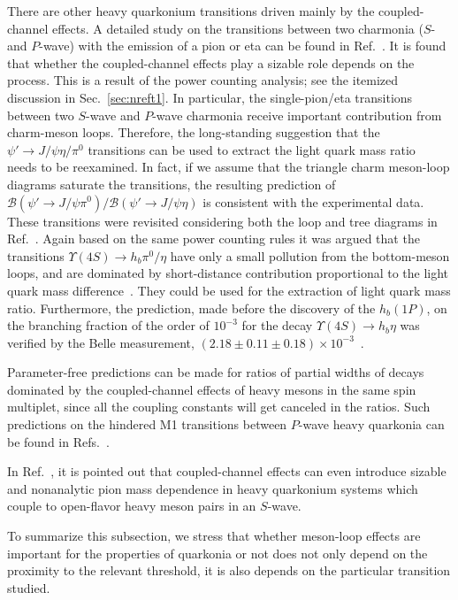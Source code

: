 There are other heavy quarkonium transitions driven mainly by the
coupled-channel effects. A detailed study on the transitions between two
charmonia ($S$- and $P$-wave) with the emission of a pion or eta can be found in
Ref.~\cite{Guo:2010ak}. It is found that whether the coupled-channel effects
play a sizable role depends on the process. This is a result of the power
counting analysis; see the itemized discussion in Sec.~\ref{sec:nreft1}.
In particular, the  single-pion/eta transitions between two $S$-wave and
$P$-wave charmonia receive important contribution from charm-meson loops.
Therefore, the long-standing suggestion that the  $\psi'\to J/\psi\eta/\pi^0$
transitions can be used to extract the light quark mass
ratio~\cite{Ioffe:1979rv} needs to be reexamined. In fact, if we assume that
the triangle charm meson-loop diagrams saturate the transitions, the resulting
prediction of $\mathcal{B}(\psi'\to J/\psi\pi^0)/\mathcal{B}(\psi'\to
J/\psi\eta)$ is consistent with the experimental data. These transitions were
revisited considering both the loop and tree diagrams in
Ref.~\cite{Mehen:2011tp}.
Again based on the same power counting rules it was argued that the transitions
$\Upsilon(4S)\to h_b\pi^0/\eta$ have only a small pollution from the
bottom-meson loops, and are dominated by short-distance contribution
proportional to the light quark mass difference~\cite{Guo:2010ca}. They could be
used for the extraction of light quark mass ratio. Furthermore, the prediction,
made before the discovery of the $h_b(1P)$, on the branching fraction of the
order of $10^{-3}$ for the decay $\Upsilon(4S)\to h_b\eta$ was verified by the
Belle measurement, $(2.18\pm0.11\pm0.18)\times10^{-3}$~\cite{Tamponi:2015xzb}.

Parameter-free predictions can be made for ratios of partial widths of decays
dominated by the coupled-channel effects of heavy mesons in the same spin
multiplet, since all the coupling constants will get canceled in the ratios.
Such predictions on the hindered M1 transitions between $P$-wave heavy quarkonia
can be found in Refs.~\cite{Guo:2011dv,Guo:2016yxl}.

In Ref.~\cite{Guo:2012tg}, it is pointed out that coupled-channel effects can
even introduce sizable and nonanalytic pion mass dependence in heavy quarkonium
systems which couple to open-flavor heavy meson pairs in an $S$-wave.

To summarize this subsection, we stress that whether meson-loop effects are
important for the properties of quarkonia or not does not only depend on the
proximity to the relevant threshold, it is  also depends on the particular
transition studied.



